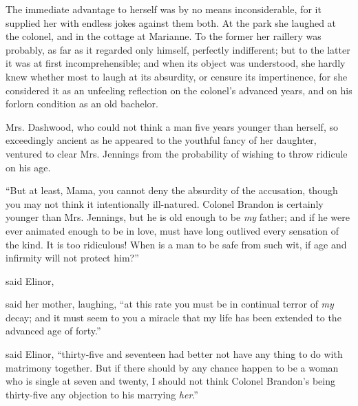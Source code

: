 The immediate advantage to herself was by no means inconsiderable, for it supplied her with endless jokes against them both. At the park she laughed at the colonel, and in the cottage at Marianne. To the former her raillery was probably, as far as it regarded only himself, perfectly indifferent; but to the latter it was at first incomprehensible; and when its object was understood, she hardly knew whether most to laugh at its absurdity, or censure its impertinence, for she considered it as an unfeeling reflection on the colonel's advanced years, and on his forlorn condition as an old bachelor.

Mrs. Dashwood, who could not think a man five years younger than herself, so exceedingly ancient as he appeared to the youthful fancy of her daughter, ventured to clear Mrs. Jennings from the probability of wishing to throw ridicule on his age.

“But at least, Mama, you cannot deny the absurdity of the accusation, though you may not think it intentionally ill-natured. Colonel Brandon is certainly younger than Mrs. Jennings, but he is old enough to be {\em my} father; and if he were ever animated enough to be in love, must have long outlived every sensation of the kind. It is too ridiculous! When is a man to be safe from such wit, if age and infirmity will not protect him?”

 said Elinor, 


 said her mother, laughing, “at this rate you must be in continual terror of {\em my} decay; and it must seem to you a miracle that my life has been extended to the advanced age of forty.”


 said Elinor, “thirty-five and seventeen had better not have any thing to do with matrimony together. But if there should by any chance happen to be a woman who is single at seven and twenty, I should not think Colonel Brandon's being thirty-five any objection to his marrying {\em her}.”


